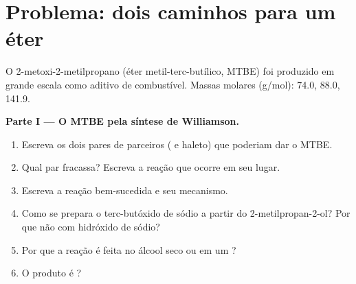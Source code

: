 \section{Problema: dois caminhos para um éter}

\begin{problem}
\label{pb:b1:alcohol-activation:1}
O 2-metoxi-2-metilpropano (éter metil-terc-butílico, MTBE) foi produzido
em grande escala como aditivo de combustível. Massas molares (\unit{g/mol}): 
74.0,  88.0,  141.9.

\medskip
\noindent\textbf{Parte I --- O MTBE pela síntese de Williamson.}
\begin{enumerate}
  \item Escreva os dois pares de parceiros ( e haleto) que
        poderiam dar o MTBE.
  \item Qual par fracassa? Escreva a reação que ocorre em seu lugar.
  \item Escreva a reação bem-sucedida e seu mecanismo.
  \item Como se prepara o terc-butóxido de sódio a partir do
        2-metilpropan-2-ol? Por que não com hidróxido de sódio?
  \item Por que a reação é feita no álcool seco ou em um ?
  \item O produto é ?
\end{enumerate}


\end{problem}

